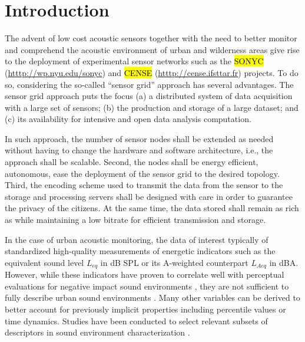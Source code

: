 \documentclass[sensors,article,accept,moreauthors,pdftex,10pt,a4paper]{mdpi}
\begin{document}


\section{Introduction}

The advent of low cost acoustic sensors together with the need to better monitor and comprehend the acoustic environment of urban and wilderness areas give rise to the deployment of experimental sensor networks such as the \hl{SONYC} ({\url{htttp://wp.nyu.edu/sonyc}}) \cite{mydlarz2017implementation} and %
 \hl{CENSE} ({\url{htttp://cense.ifsttar.fr}}) \cite{picault2017} projects. To do so, considering the so-called ``sensor grid'' approach  \cite{lim2005sensor,tham2005sensorgrid} has several advantages. The sensor grid approach puts the focus  (a) a distributed system of data acquisition with a large set of sensors; (b) the production and storage of a large dataset; and (c) its availability for intensive and open data analysis computation.

In such approach, the number of sensor nodes shall be extended as needed without having to change the hardware and software architecture, i.e., the approach shall be scalable. Second, the nodes shall be energy efficient,  autonomous,  ease the deployment of the sensor grid to the desired topology. Third, the encoding scheme used to transmit the data from the sensor to the storage and processing servers shall be designed with care in order to guarantee the privacy of the citizens. At the same time, the data stored shall remain as rich as  while maintaining a low bitrate for efficient transmission and storage.

In the case of urban acoustic monitoring, the data of interest typically  of standardized high-quality measurements of energetic indicators such as the equivalent sound level $L_{eq}$ in dB SPL or its A-weighted counterpart $L_{Aeq}$ in dBA. However, while these indicators have proven to correlate well with perceptual evaluations for negative impact sound environments \cite{gozalo2015}, they are not sufficient to fully describe urban sound environments \cite{rychtarikova2013}. Many other variables can be derived to better account for previously implicit properties \cite{can2016} including percentile values or time dynamics. Studies have been conducted to select relevant subsets of descriptors in sound environment characterization \cite{can2015, brocolini2013, nilsson2007}.
\end{document}
